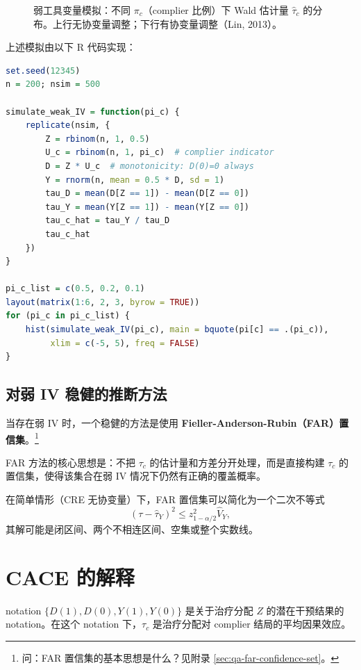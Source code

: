 \begin{figure}[ht]
  \centering
  \caption{弱工具变量模拟：不同 $\pi_c$（complier 比例）下 Wald 估计量 $\hat{\tau}_c$ 的分布。上行无协变量调整；下行有协变量调整（Lin, 2013）。}
  \label{fig:21-weak-iv-hist}
\end{figure}

上述模拟由以下 R 代码实现：

\begin{lstlisting}[language=R]
set.seed(12345)
n = 200; nsim = 500

simulate_weak_IV = function(pi_c) {
    replicate(nsim, {
        Z = rbinom(n, 1, 0.5)
        U_c = rbinom(n, 1, pi_c)  # complier indicator
        D = Z * U_c  # monotonicity: D(0)=0 always
        Y = rnorm(n, mean = 0.5 * D, sd = 1)
        tau_D = mean(D[Z == 1]) - mean(D[Z == 0])
        tau_Y = mean(Y[Z == 1]) - mean(Y[Z == 0])
        tau_c_hat = tau_Y / tau_D
        tau_c_hat
    })
}

pi_c_list = c(0.5, 0.2, 0.1)
layout(matrix(1:6, 2, 3, byrow = TRUE))
for (pi_c in pi_c_list) {
    hist(simulate_weak_IV(pi_c), main = bquote(pi[c] == .(pi_c)),
         xlim = c(-5, 5), freq = FALSE)
}
\end{lstlisting}

\subsection{对弱 IV 稳健的推断方法}

当存在弱 IV 时，一个稳健的方法是使用 \textbf{Fieller-Anderson-Rubin（FAR）置信集}。\footnote{问：FAR 置信集的基本思想是什么？见附录 \cref{sec:qa-far-confidence-set}。}

FAR 方法的核心思想是：不把 $\tau_c$ 的估计量和方差分开处理，而是直接构建 $\tau_c$ 的置信集，使得该集合在弱 IV 情况下仍然有正确的覆盖概率。

在简单情形（CRE 无协变量）下，FAR 置信集可以简化为一个二次不等式
\[
(\tau - \hat{\tau}_Y)^2 \leq z_{1-\alpha/2}^2 \hat{V}_Y,
\]
其解可能是闭区间、两个不相连区间、空集或整个实数线。

\section{CACE 的解释}
\label{sec:21-interpreting-cace}

notation $\{D(1), D(0), Y(1), Y(0)\}$ 是关于治疗分配 $Z$ 的潜在干预结果的 notation。在这个 notation 下，$\tau_c$ 是治疗分配对 complier 结局的平均因果效应。

